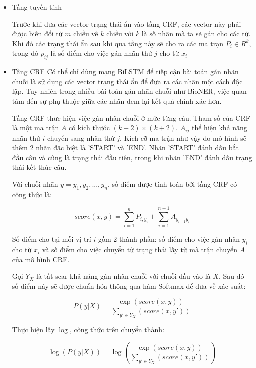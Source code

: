 \documentclass[../main.tex]{subfiles}
\begin{document}
\begin{itemize}
\item Tầng tuyến tính

Trước khi đưa các vector trạng thái ẩn vào tầng CRF, các vector này phải được biến đổi từ $m$ chiều về $k$ chiều với $k$ là số nhãn mà ta sẽ gán cho các từ. Khi đó các trạng thái ẩn sau khi qua tầng này sẽ cho ra các ma trạn $P_{i} \in R^{k}$, trong đó $p_{ij}$ là số điểm cho việc gán nhãn thứ $j$ cho từ $x_{i}$

\item Tầng CRF
Có thể chỉ dùng mạng BiLSTM để tiếp cận bài toán gán nhãn chuỗi là sử dụng các vector trạng thái ẩn để đưa ra các nhãn một cách độc lập. Tuy nhiên trong nhiều bài toán gán nhãn chuỗi như BioNER, việc quan tâm đến sự phụ thuộc giữa các nhãn đem lại kết quả chính xác hơn.

Tầng CRF thưc hiện việc gán nhãn chuỗi ở mức từng câu. Tham số của CRF là một ma trận $A$ có kích thước $(k + 2) \times (k + 2)$. $A_{ij}$ thể hiện khả năng nhãn thứ $i$ chuyển sang nhãn thứ $j$. Kích cỡ ma trận như vậy do mô hình sẽ thêm $2$ nhãn đặc biệt là 'START' và 'END'. Nhãn 'START' đánh dấu bắt đầu câu và cũng là trạng thái đầu tiên, trong khi nhãn 'END' đánh dấu trạng thái kết thúc câu. 

Với chuỗi nhãn $y = {y_{1}, y_{2}, ..., y_{n}}$, số điểm được tính toán bởi tầng CRF có công thức là:

\begin{equation}
score(x, y) = \sum^{n}_{i=1}P_{i, y_{i}} + \sum^{n+1}_{i=1} A_{y_{i-1}y_{i}} \nonumber
\end{equation}

Số điểm cho tại mỗi vị trí $i$ gồm $2$ thành phần: số điểm cho việc gán nhãn $y_{i}$ cho từ $x_{i}$ và số điểm cho việc chuyển từ trạng thái lấy từ mà trận chuyển $A$ của mô hình CRF. 

Gọi $Y_{X}$ là tất scar khả năng gán nhãn chuỗi với chuỗi đầu vào là $X$. Sau đó số điểm này sẽ được chuẩn hóa thông qua hàm Softmax để đưa về xác suất:

\begin{equation}
P(y|X) = \frac{\exp(score(x, y))}{\sum_{y' \in Y_{X}}(score(x, y'))} \nonumber
\end{equation}

Thực hiện lấy $\log$, công thức trên chuyển thành: 

\begin{equation}
\log(P(y|X)) = \log(\frac{\exp(score(x, y))}{\sum_{y' \in Y_{X}}(score(x, y'))}) \nonumber
\end{equation}


\end{itemize}
\end{document}
